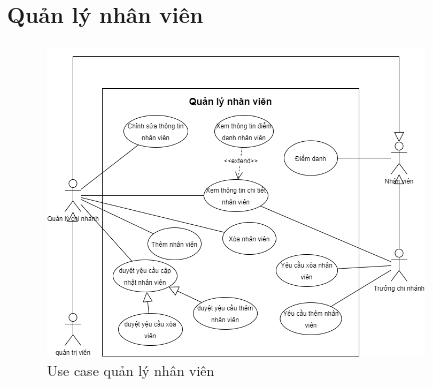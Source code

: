     \subsection{Quản lý nhân viên}    
        \begin{figure}[!htp]
            \begin{center}
                \includegraphics[width=10cm]{img/UseCase/UseCase-Quản lý nhân viên.drawio.png}
            \end{center}
            \caption{Use case quản lý nhân viên}
        \end{figure}


